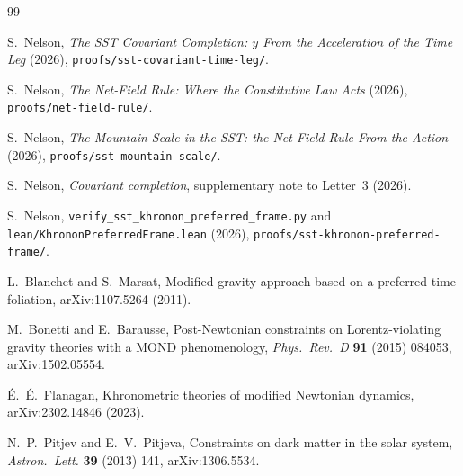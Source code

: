 \documentclass[twocolumn]{iopjournal}
\begin{document}
\begin{thebibliography}{99}

S.~Nelson,
\textit{The SST Covariant Completion: $y$ From the Acceleration of the
Time Leg} (2026), \texttt{proofs/sst-covariant-time-leg/}.

S.~Nelson,
\textit{The Net-Field Rule: Where the Constitutive Law Acts} (2026),
\texttt{proofs/net-field-rule/}.

S.~Nelson,
\textit{The Mountain Scale in the SST: the Net-Field Rule From the
Action} (2026), \texttt{proofs/sst-mountain-scale/}.

S.~Nelson,
\textit{Covariant completion}, supplementary note to Letter~3 (2026).

S.~Nelson,
\texttt{verify\_sst\_khronon\_preferred\_frame.py} and
\texttt{lean/KhrononPreferredFrame.lean} (2026),
\texttt{proofs/sst-khronon-preferred-frame/}.

L.~Blanchet and S.~Marsat,
Modified gravity approach based on a preferred time foliation,
arXiv:1107.5264 (2011).

M.~Bonetti and E.~Barausse,
Post-Newtonian constraints on Lorentz-violating gravity theories with
a MOND phenomenology,
\textit{Phys.\ Rev.\ D} \textbf{91} (2015) 084053, arXiv:1502.05554.

\'E.~\'E.~Flanagan,
Khronometric theories of modified Newtonian dynamics,
arXiv:2302.14846 (2023).

N.~P.~Pitjev and E.~V.~Pitjeva,
Constraints on dark matter in the solar system,
\textit{Astron.\ Lett.} \textbf{39} (2013) 141, arXiv:1306.5534.

\end{thebibliography}
\end{document}
